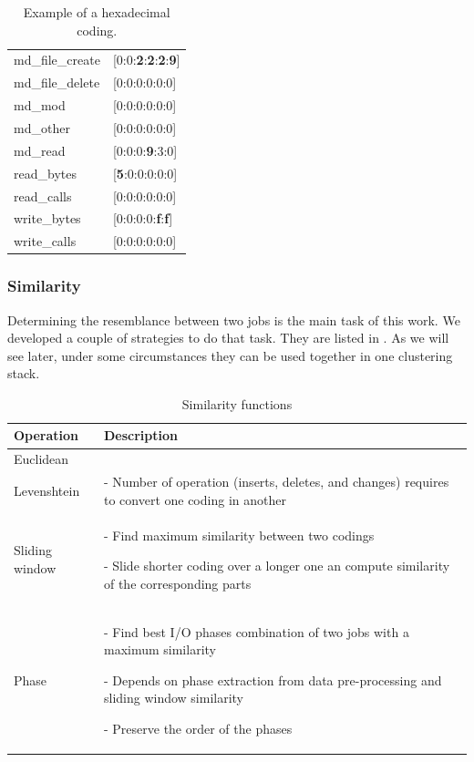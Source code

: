 \documentclass[]{llncs}
\begin{document}
\begin{table}
  \centering
  \begin{tabular}{ll}
    md\_file\_create & [0:0:\textbf{2}:\textbf{2}:\textbf{2}:\textbf{9}] \\ 
    md\_file\_delete & [0:0:0:0:0:0]                                     \\ 
    md\_mod          & [0:0:0:0:0:0]                                     \\ 
    md\_other        & [0:0:0:0:0:0]                                     \\ 
    md\_read         & [0:0:0:\textbf{9}:3:0]                            \\ 
    read\_bytes      & [\textbf{5}:0:0:0:0:0]                            \\ 
    read\_calls      & [0:0:0:0:0:0]                                     \\ 
    write\_bytes     & [0:0:0:0:\textbf{f}:\textbf{f}]                   \\ 
    write\_calls     & [0:0:0:0:0:0]
  \end{tabular}
  \caption{Example of a hexadecimal coding.}
  \label{tab:hex_example}
\end{table}

\subsubsection{Similarity}
Determining the resemblance between two jobs is the main task of this work.
We developed a couple of strategies to do that task.
They are listed in .
As we will see later, under some circumstances they can be used together in one clustering stack.

\begin{table}
  \centering
	\begin{tabularx}{\textwidth}{lX}
    \hline
    Operation & Description \\
    \hline
    Euclidean & \\
    \hline
    Levenshtein &  - Number of operation (inserts, deletes, and changes) requires to convert one coding in another \\
    \hline
    Sliding window &  - Find maximum similarity between two codings \par - Slide shorter coding over a longer one an compute similarity of the corresponding parts \\
    \hline
    Phase &  - Find best I/O phases combination of two jobs with a maximum similarity \par - Depends on phase extraction from data pre-processing and sliding window similarity \par - Preserve the order of the phases \\
    \hline
  \end{tabularx}
  \caption{Similarity functions}
  \label{tab:sim_funcs}
\end{table}
\end{document}
